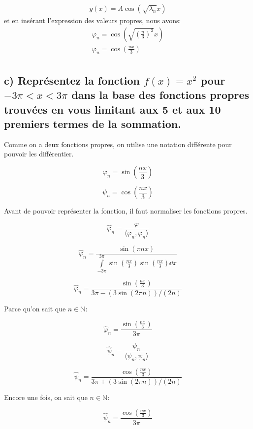 \documentclass{article}
\begin{document}
\begin{gather*}
    y(x)=A\cos(\sqrt{\lambda_n}x)
\end{gather*}
et en insérant l'expression des valeurs propres, nous avons:
\begin{gather*}
    \varphi_n=\cos(\sqrt{(\frac{n}{3})^2}x)\\
    \varphi_n=\cos(\frac{nx}{3})\tag*{où $n=1, 2, 3,...$}\\
\end{gather*}
















\subsection*{c) Représentez la fonction $f(x) = x^2$ pour $-3\pi < x < 3\pi$ dans la base des fonctions propres trouvées
en vous limitant aux 5 et aux 10 premiers termes de la sommation.}

Comme on a deux fonctions propres, on utilise une notation différente pour pouvoir les différentier.

$$ \varphi_n = \sin(\frac{n x}{3}) $$

$$\psi_n = \cos(\frac{nx}{3})$$

Avant de pouvoir représenter la fonction, il faut normaliser les fonctions propres.

$$\hat{\varphi}_n = \frac{\varphi}{\langle \varphi_n,\varphi_n \rangle} $$

$$\hat{\varphi}_n = \frac{\sin(\pi nx)}{\int\limits_{-3\pi}^{3\pi}\sin(\frac{nx}{3})\sin(\frac{nx}{3})\dd x}  $$

$$\hat{\varphi}_n = \frac{\sin(\frac{nx}{3})}{ 3 \pi - (3 \sin(2 \pi n))/(2 n)} $$

Parce qu'on sait que $n \in \mathbb{N}$:

$$\hat{\varphi}_n = \frac{\sin(\frac{nx}{3})}{ 3 \pi} $$

$$\hat{\psi}_n = \frac{\psi_n}{\langle \psi_n,\psi_n \rangle}$$

$$\hat{\psi}_n = \frac{\cos(\frac{nx}{3})}{3 \pi + (3 \sin(2 \pi n))/(2 n)}$$

Encore une fois, on sait que $n \in \mathbb{N}$:

$$\hat{\psi}_n = \frac{\cos(\frac{nx}{3})}{3 \pi}$$
\end{document}
